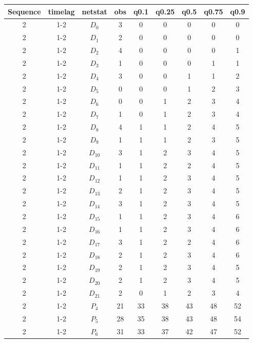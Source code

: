 \documentclass[a4paper, 11pt]{report}
\theoremstyle{definition}
\begin{document}
\begin{table}[h!]
    \centering
        \begin{tabular}{c| c | c | c | c |c |c |c |c }
            Sequence& timelag & netstat & obs & q0.1 & q0.25 & q0.5 & q0.75 & q0.9 \\
            \hline \hline
            2 & 1-2 & $D_0$ & 3 &  0& 0& 0& 0& 0 \\
            2 & 1-2 & $D_1$ & 2 &  0& 0& 0& 0& 0 \\
            2 & 1-2 & $D_2$ & 4 &  0& 0& 0& 0& 1 \\
            2 & 1-2 & $D_3$ & 1 &  0& 0& 0& 1& 1 \\
            2 & 1-2 & $D_4$ & 3 &  0& 0& 1& 1& 2 \\
            2 & 1-2 & $D_5$ & 0 &  0& 0& 1& 2& 3 \\
            2 & 1-2 & $D_6$ & 0 &  0& 1& 2& 3& 4 \\
            2 & 1-2 & $D_7$ & 1 &  0& 1& 2& 3& 4 \\
            2 & 1-2 & $D_8$ & 4 &  1& 1& 2& 4& 5 \\
            2 & 1-2 & $D_9$ & 1 &  1& 1& 2& 3& 5 \\
            2 & 1-2 & $D_{10}$ & 3 &  1& 2& 3& 4& 5 \\
            2 & 1-2 & $D_{11}$ & 1 &  1& 2& 2& 4& 5 \\
            2 & 1-2 & $D_{12}$ & 1 &  1& 2& 3& 4& 5 \\
            2 & 1-2 & $D_{13}$ & 2 &  1& 2& 3& 4& 5 \\
            2 & 1-2 & $D_{14}$ & 3 &  1& 2& 3& 4& 5 \\
            2 & 1-2 & $D_{15}$ & 1 &  1& 2& 3& 4& 6 \\
            2 & 1-2 & $D_{16}$ & 1 &  1& 2& 3& 4& 6 \\
            2 & 1-2 & $D_{17}$ & 3 &  1& 2& 2& 4& 6 \\
            2 & 1-2 & $D_{18}$ & 2 &  1& 2& 3& 4& 6 \\
            2 & 1-2 & $D_{19}$ & 2 &  1& 2& 3& 4& 5 \\
            2 & 1-2 & $D_{20}$ & 2 &  1& 2& 3& 4& 5 \\
            2 & 1-2 & $D_{21}$ & 2 &  0& 1& 2& 3& 4 \\
            2 & 1-2 & $P_4$ & 21 & 33& 38& 43& 48& 52 \\
            2 & 1-2 & $P_5$ & 28 & 35& 38& 43& 48& 54 \\
            2 & 1-2 & $P_6$ & 31 & 33& 37& 42& 47& 52 \\

\end{tabular}
\end{table}
\end{document}
